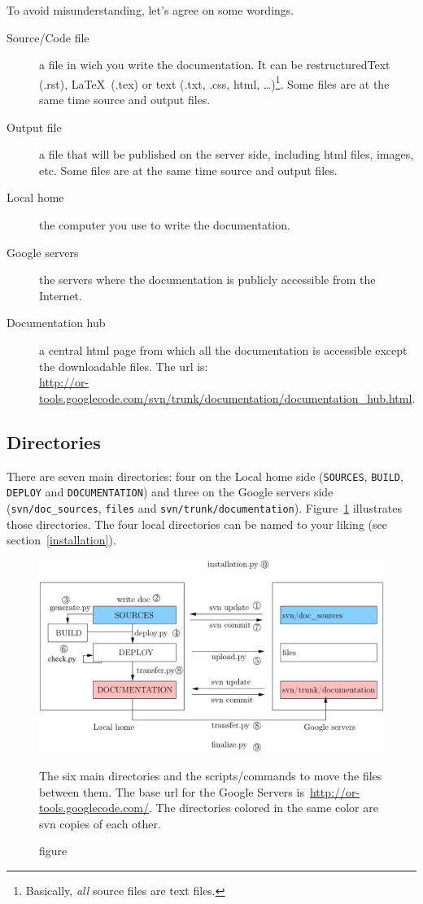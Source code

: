 \documentclass[a4paper,10pt]{article}
\newcommand{\code}[1]{\texttt{#1}}
\begin{document}
To avoid misunderstanding, let's agree on some wordings.

\begin{description}
 \item[Source/Code file] a file in wich you write the documentation. It can be restructuredText (.rst), \LaTeX\ (.tex) or text (.txt, .css, html, \ldots)\footnote{Basically, \emph{all} source files are text files.}. Some files are at the same time source and output files.
 \item[Output file] a file that will be published on the server side, including html files, images, etc. Some files are at the same time source and output files.
 \item[Local home] the computer you use to write the documentation.
 \item[Google servers] the servers where the documentation is publicly accessible from the Internet.
 \item[Documentation hub] a central html page from which all the documentation is accessible except the downloadable files. The url is:\\
 \href{http://or-tools.googlecode.com/svn/trunk/documentation/documentation\_hub.html}{http://or-tools.googlecode.com/svn/trunk/documentation/documentation\_hub.html}.
\end{description}

\subsection{Directories}

There are seven main directories: four on the Local home side (\code{SOURCES}, \code{BUILD}, \code{DEPLOY} and \code{DOCUMENTATION}) and three on the Google servers side (\code{svn/doc\_sources}, \code{files} and  \code{svn/trunk/documentation}). Figure~\ref{pic_directories} illustrates those directories. The four local directories can be named to your liking (see section~\ref{installation}).

\begin{figure}[h]
   \centering
   \includegraphics[scale=0.8]{images/directories.pdf}
   \caption{figure}{The six main directories and the scripts/commands to move the files between them. The base url for the Google Servers is~\href{http://or-tools.googlecode.com/}{http://or-tools.googlecode.com/}. The directories colored in the same color are svn copies of each other\footnotemark.}\label{pic_directories}
 \end{figure}
\end{document}
